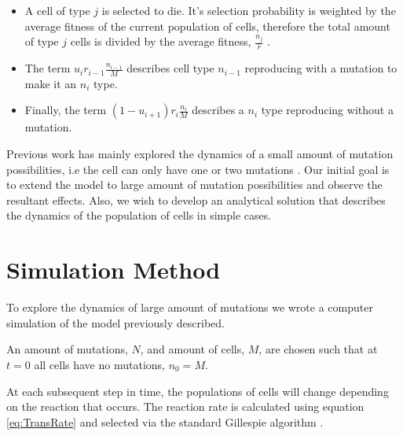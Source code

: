 \documentclass[12pt, a4paper,]{article}
\let\cite=\supercite
\begin{document}
\begin{itemize}
\item A cell of type $j$ is selected to die. It's selection probability is weighted by the average fitness of the current population of cells, therefore the total amount of type $j$ cells is divided by the average fitness, $\frac{n_j}{\bar{r}}$ . 
\item The term $u_i r_{i-1} \frac{n_{i-1}}{M}$ describes cell type $n_{i-1}$ reproducing with a mutation to make it an $n_i$ type. 
\item Finally, the term $(1- u_{i+1} ) r _i \frac{n_i}{M}$ describes a $n_i$ type reproducing without a mutation. 
\end{itemize}

Previous work has mainly explored the dynamics of a small amount of mutation possibilities, i.e the cell can only have one or two mutations \cite{ashcroft_stochastic_2014}. Our initial goal is to extend the model to large amount of mutation possibilities and observe the resultant effects. Also, we wish to develop an analytical solution that describes the dynamics of the population of cells in simple cases. 

\section{Simulation Method}

To explore the dynamics of large amount of mutations we wrote a computer simulation of the model previously described. 

An amount of mutations, $N$, and amount of cells, $M$, are chosen such that at $t=0$ all cells have no mutations, $n_0 = M$. 

At each subsequent step in time, the populations of cells will change depending on the reaction that occurs. The reaction rate is calculated using equation \eqref{eq:TransRate} and selected via the standard Gillespie algorithm \cite{anderson_modified_2007}. 

\end{document}
